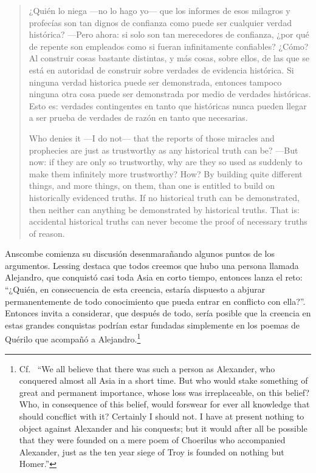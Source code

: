 \begin{enumerate}
  \blockquote[Who denies it ---I do not--- that the reports of those miracles
  and prophecies are just as trustworthy as any historical truth can be? ---But
  now: if they are only so trustworthy, why are they so used as suddenly to make
  them infinitely more trustworthy? How? By building quite different things, and
  more things, on them, than one is entitled to build on historically evidenced
  truths. If no historical truth can be demonstrated, then neither can anything
  be demonstrated by historical truths. That is: accidental historical truths
  can never become the proof of necessary truths of reason.]{¿Quién lo niega
    ---no lo hago yo--- que los informes de esos milagros y profecías son tan
    dignos de confianza como puede ser cualquier verdad histórica? ---Pero
    ahora: si solo son tan merecedores de confianza, ¿por qué de repente son
    empleados como si fueran infinitamente confiables? ¿Cómo? Al construir cosas
    bastante distintas, y más cosas, sobre ellos, de las que se está en
    autoridad de construir sobre verdades de evidencia histórica. Si ninguna
    verdad historica puede ser demonstrada, entonces tampoco ninguna otra cosa
    puede ser demonstrada por medio de verdades históricas. Esto es: verdades
    contingentes en tanto que históricas nunca pueden llegar a ser prueba de
    verdades de razón en tanto que necesarias.}
\end{enumerate}

Anscombe comienza su discusión desenmarañando algunos puntos de los argumentos.
Lessing destaca que todos creemos que hubo una persona llamada Alejandro, que
conquistó casi toda Asia en corto tiempo, entonces lanza el reto:
\enquote{¿Quién, en consecuencia de esta creencia, estaría dispuesto a abjurar
  permanentemente de todo conocimiento que pueda entrar en conflicto con ella?}.
Entonces invita a considerar, que después de todo, sería posible que la creencia
en estas grandes conquistas podrían estar fundadas simplemente en los poemas de
Quérilo que acompañó a Alejandro.\footnote{Cf.~ \enquote{We all believe that
    there was such a person as Alexander, who conquered almost all Asia in a
    short time. But who would stake something of great and permanent importance,
    whose loss was irreplaceable, on this belief? Who, in consequence of this
    belief, would forswear for ever all knowledge that should concflict with it?
    Certainly I should not. I have at present nothing to object against
    Alexander and his conquests; but it would after all be possible that they
    were founded on a mere poem of Choerilus who accompanied Alexander, just as
    the ten year siege of Troy is founded on nothing but Homer.}}


